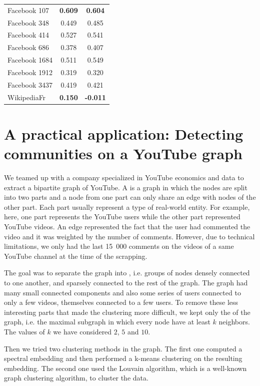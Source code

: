 \begin{table}[t]
\begin{center}
\begin{tabular}{l|c|c}
Facebook 107 & \textbf{0.609} & \textbf{0.604}\\
Facebook 348 & 0.449 & 0.485\\
Facebook 414 & 0.527 & 0.541\\
Facebook 686 & 0.378 & 0.407\\
Facebook 1684 & 0.511 & 0.549\\
Facebook 1912 & 0.319 & 0.320\\
Facebook 3437 & 0.419 & 0.421\\
WikipediaFr  & \textbf{0.150} & \textbf{-0.011}\\
\hline
\end{tabular}
\end{center}
\label{tab:CISIP_SVD_scores}
\end{table}

\section{A practical application: Detecting communities on a YouTube graph}
We teamed up with a company specialized in YouTube economics and data to extract a bipartite graph of YouTube. A  is a graph in which the nodes are split into two parts and a node from one part can only share an edge with nodes of the other part. Each part usually represent a type of real-world entity. For example, here, one part represents the YouTube users while the other part represented YouTube videos. An edge represented the fact that the user had commented the video and it was weighted by the number of comments. However, due to technical limitations, we only had the last 15~000 comments on the videos of a same YouTube channel at the time of the scrapping.

The goal was to separate the graph into , i.e. groups of nodes densely connected to one another, and sparsely connected to the rest of the graph. The graph had many small connected components and also some series of users connected to only a few videos, themselves connected to a few users. To remove these less interesting parts that made the clustering more difficult, we kept only the  of the graph, i.e. the maximal subgraph in which every node have at least $k$ neighbors. The values of $k$ we have considered $2$, $5$ and $10$. 

Then we tried two clustering methods in the graph. The first one computed a spectral embedding and then performed a k-means clustering on the resulting embedding. The second one used the Louvain algorithm, which is a well-known graph clustering algorithm, to cluster the data.

